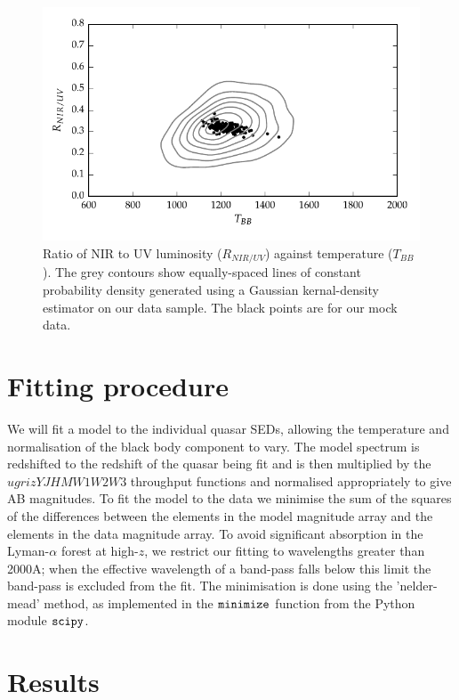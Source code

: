 \begin{figure}
  \centering
  \includegraphics[width=\textwidth]{figures/chapter05/ratio_tbb_contours.pdf}
  \caption{Ratio of NIR to UV luminosity ($R_{NIR/UV}$) against temperature ($T_{BB}$). The grey contours show equally-spaced lines of constant probability density generated using a Gaussian kernal-density estimator on our data sample. The black points are for our mock data.}
  \label{fig:ratio_tbb_contours}
\end{figure}

\section{Fitting procedure}

We will fit a model to the individual quasar SEDs, allowing the temperature and normalisation of the black body component to vary. 
The model spectrum is redshifted to the redshift of the quasar being fit and is then multiplied by the $ugrizYJHMW1W2W3$ throughput functions and normalised appropriately to give AB magnitudes. 
To fit the model to the data we minimise the sum of the squares of the differences between the elements in the model magnitude array and the elements in the data magnitude array. 
To avoid significant absorption in the Lyman-$\alpha$ forest at high-$z$, we restrict our fitting to wavelengths greater than 2000A; when the effective wavelength of a band-pass falls below this limit the band-pass is excluded from the fit. 
The minimisation is done using the 'nelder-mead' method, as implemented in the ${\tt minimize}$ function from the Python module ${\tt scipy}$. 

\section{Results}

